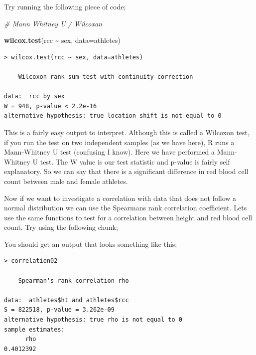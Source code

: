 \documentclass[
]{book}
\newenvironment{Shaded}{\begin{snugshade}}{\end{snugshade}}
\newcommand{\AttributeTok}[1]{\textcolor[rgb]{0.13,0.29,0.53}{#1}}
\newcommand{\CommentTok}[1]{\textcolor[rgb]{0.56,0.35,0.01}{\textit{#1}}}
\newcommand{\FunctionTok}[1]{\textcolor[rgb]{0.13,0.29,0.53}{\textbf{#1}}}
\newcommand{\NormalTok}[1]{#1}
\newcommand{\OtherTok}[1]{\textcolor[rgb]{0.56,0.35,0.01}{#1}}
\newcommand{\SpecialCharTok}[1]{\textcolor[rgb]{0.81,0.36,0.00}{\textbf{#1}}}
\newcommand{\StringTok}[1]{\textcolor[rgb]{0.31,0.60,0.02}{#1}}
\begin{document}
Try running the following piece of code;

\begin{Shaded}
\begin{Highlighting}[]
\CommentTok{\# Mann Whitney U / Wilcoxan }

\FunctionTok{wilcox.test}\NormalTok{(rcc }\SpecialCharTok{\textasciitilde{}}\NormalTok{ sex, }\AttributeTok{data=}\NormalTok{athletes) }
\end{Highlighting}
\end{Shaded}

\begin{verbatim}
> wilcox.test(rcc ~ sex, data=athletes) 

    Wilcoxon rank sum test with continuity correction

data:  rcc by sex
W = 948, p-value < 2.2e-16
alternative hypothesis: true location shift is not equal to 0
\end{verbatim}

This is a fairly easy output to interpret. Although this is called a Wilcoxon test, if you run the test on two independent samples (as we have here), R runs a Mann-Whitney U test (confusing I know). Here we have performed a Mann-Whitney U test. The W value is our test statistic and p-value is fairly self explanatory. So we can say that there is a significant difference in red blood cell count between male and female athletes.

Now if we want to investigate a correlation with data that does not follow a normal distribution we can use the Spearmans rank correlation coefficient. Lets use the same functions to test for a correlation between height and red blood cell count. Try using the following chunk;

\begin{Shaded}
\end{Shaded}

You should get an output that looks something like this;

\begin{verbatim}
> correlation02

    Spearman's rank correlation rho

data:  athletes$ht and athletes$rcc
S = 822518, p-value = 3.262e-09
alternative hypothesis: true rho is not equal to 0
sample estimates:
      rho 
0.4012392
\end{verbatim}
\end{document}
